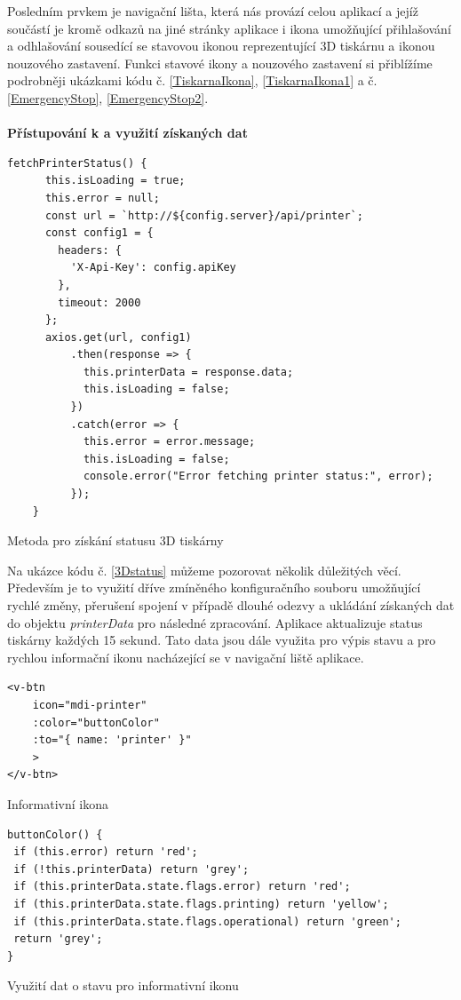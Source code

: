 \documentclass[twoside, 12pt]{article}
\begin{document}
Posledním prvkem je navigační lišta, která nás provází celou aplikací a jejíž součástí je kromě odkazů na jiné stránky aplikace i ikona umožňující přihlašování a odhlašování sousedící se stavovou ikonou reprezentující 3D tiskárnu a ikonou nouzového zastavení. Funkci stavové ikony a nouzového zastavení si přiblížíme podrobněji ukázkami kódu č. \ref{TiskarnaIkona}, \ref{TiskarnaIkona1} a č. \ref{EmergencyStop}, \ref{EmergencyStop2}.
\\
\\
\textbf{Přístupování k a využití získaných dat}

\begin{listing}
\begin{verbatim}
fetchPrinterStatus() {
      this.isLoading = true;
      this.error = null;
      const url = `http://${config.server}/api/printer`;
      const config1 = {
        headers: {
          'X-Api-Key': config.apiKey
        },
        timeout: 2000
      };
      axios.get(url, config1)
          .then(response => {
            this.printerData = response.data;
            this.isLoading = false;
          })
          .catch(error => {
            this.error = error.message;
            this.isLoading = false;
            console.error("Error fetching printer status:", error);
          });
    }
\end{verbatim}
\caption{Metoda pro získání statusu 3D tiskárny}
\label{3Dstatus}
\end{listing}

Na ukázce kódu č. \ref{3Dstatus} můžeme pozorovat několik důležitých věcí. Především je to využití dříve zmíněného konfiguračního souboru umožňující rychlé změny, přerušení spojení v případě dlouhé odezvy a ukládání získaných dat do objektu \textit{printerData} pro následné zpracování. Aplikace aktualizuje status tiskárny každých 15 sekund. Tato data jsou dále využita pro výpis stavu a pro rychlou informační ikonu nacházející se v navigační liště aplikace.


\begin{listing}
\begin{verbatim}
<v-btn 
    icon="mdi-printer" 
    :color="buttonColor" 
    :to="{ name: 'printer' }"
    >
</v-btn>
\end{verbatim}
\caption{Informativní ikona}
\label{TiskarnaIkona}
\end{listing}

\begin{listing}
\begin{verbatim}
buttonColor() {
 if (this.error) return 'red';
 if (!this.printerData) return 'grey';
 if (this.printerData.state.flags.error) return 'red';
 if (this.printerData.state.flags.printing) return 'yellow';
 if (this.printerData.state.flags.operational) return 'green';
 return 'grey';
}
\end{verbatim}
\caption{Využití dat o stavu pro informativní ikonu}
\label{TiskarnaIkona1}
\end{listing}
\end{document}
